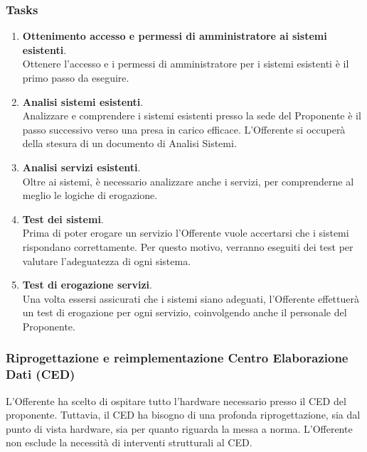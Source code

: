                     \subsubsection*{Tasks}
					\begin{enumerate}
                    
                    	 \item \textbf{Ottenimento accesso e permessi di amministratore ai sistemi esistenti}.\\
                         Ottenere l'accesso e i permessi di amministratore per i sistemi esistenti è il primo passo da eseguire.
						\item \textbf{Analisi sistemi esistenti}.\\
                        Analizzare e comprendere i sistemi esistenti presso la sede del Proponente è il passo successivo verso una presa in carico efficace. L'Offerente si occuperà della stesura di un documento di Analisi Sistemi.
                       \item \textbf{Analisi servizi esistenti}.\\
                        Oltre ai sistemi, è necessario analizzare anche i servizi, per comprenderne al meglio le logiche di erogazione.
                       \item \textbf{Test dei sistemi}.\\
                        Prima di poter erogare un servizio l'Offerente vuole accertarsi che i sistemi rispondano correttamente. Per questo motivo, verranno eseguiti dei test per valutare l'adeguatezza di ogni sistema.
                        \item \textbf{Test di erogazione servizi}.\\
                        Una volta essersi assicurati che i sistemi siano adeguati, l'Offerente effettuerà un test di erogazione per ogni servizio, coinvolgendo anche il personale del Proponente.
					\end{enumerate}
                
			\subsubsection{Riprogettazione e reimplementazione Centro Elaborazione Dati (CED)}
				L'Offerente ha scelto di ospitare tutto l'hardware necessario presso il CED del proponente. Tuttavia, il CED ha bisogno di una profonda riprogettazione, sia dal punto di vista hardware, sia per quanto riguarda la messa a norma. L'Offerente non esclude la necessità di interventi strutturali al CED.
                
